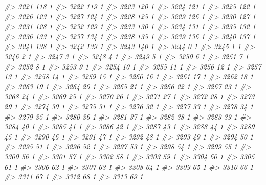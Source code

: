 \documentclass[]{article}
\newenvironment{Shaded}{\begin{snugshade}}{\end{snugshade}}
\newcommand{\CommentTok}[1]{\textcolor[rgb]{0.56,0.35,0.01}{\textit{#1}}}
\begin{document}
\begin{Shaded}
\begin{Highlighting}[]
\CommentTok{#> 3221 118  1}
\CommentTok{#> 3222 119  1}
\CommentTok{#> 3223 120  1}
\CommentTok{#> 3224 121  1}
\CommentTok{#> 3225 122  1}
\CommentTok{#> 3226 123  1}
\CommentTok{#> 3227 124  1}
\CommentTok{#> 3228 125  1}
\CommentTok{#> 3229 126  1}
\CommentTok{#> 3230 127  1}
\CommentTok{#> 3231 128  1}
\CommentTok{#> 3232 129  1}
\CommentTok{#> 3233 130  1}
\CommentTok{#> 3234 131  1}
\CommentTok{#> 3235 132  1}
\CommentTok{#> 3236 133  1}
\CommentTok{#> 3237 134  1}
\CommentTok{#> 3238 135  1}
\CommentTok{#> 3239 136  1}
\CommentTok{#> 3240 137  1}
\CommentTok{#> 3241 138  1}
\CommentTok{#> 3242 139  1}
\CommentTok{#> 3243 140  1}
\CommentTok{#> 3244   0  1}
\CommentTok{#> 3245   1  1}
\CommentTok{#> 3246   2  1}
\CommentTok{#> 3247   3  1}
\CommentTok{#> 3248   4  1}
\CommentTok{#> 3249   5  1}
\CommentTok{#> 3250   6  1}
\CommentTok{#> 3251   7  1}
\CommentTok{#> 3252   8  1}
\CommentTok{#> 3253   9  1}
\CommentTok{#> 3254  10  1}
\CommentTok{#> 3255  11  1}
\CommentTok{#> 3256  12  1}
\CommentTok{#> 3257  13  1}
\CommentTok{#> 3258  14  1}
\CommentTok{#> 3259  15  1}
\CommentTok{#> 3260  16  1}
\CommentTok{#> 3261  17  1}
\CommentTok{#> 3262  18  1}
\CommentTok{#> 3263  19  1}
\CommentTok{#> 3264  20  1}
\CommentTok{#> 3265  21  1}
\CommentTok{#> 3266  22  1}
\CommentTok{#> 3267  23  1}
\CommentTok{#> 3268  24  1}
\CommentTok{#> 3269  25  1}
\CommentTok{#> 3270  26  1}
\CommentTok{#> 3271  27  1}
\CommentTok{#> 3272  28  1}
\CommentTok{#> 3273  29  1}
\CommentTok{#> 3274  30  1}
\CommentTok{#> 3275  31  1}
\CommentTok{#> 3276  32  1}
\CommentTok{#> 3277  33  1}
\CommentTok{#> 3278  34  1}
\CommentTok{#> 3279  35  1}
\CommentTok{#> 3280  36  1}
\CommentTok{#> 3281  37  1}
\CommentTok{#> 3282  38  1}
\CommentTok{#> 3283  39  1}
\CommentTok{#> 3284  40  1}
\CommentTok{#> 3285  41  1}
\CommentTok{#> 3286  42  1}
\CommentTok{#> 3287  43  1}
\CommentTok{#> 3288  44  1}
\CommentTok{#> 3289  45  1}
\CommentTok{#> 3290  46  1}
\CommentTok{#> 3291  47  1}
\CommentTok{#> 3292  48  1}
\CommentTok{#> 3293  49  1}
\CommentTok{#> 3294  50  1}
\CommentTok{#> 3295  51  1}
\CommentTok{#> 3296  52  1}
\CommentTok{#> 3297  53  1}
\CommentTok{#> 3298  54  1}
\CommentTok{#> 3299  55  1}
\CommentTok{#> 3300  56  1}
\CommentTok{#> 3301  57  1}
\CommentTok{#> 3302  58  1}
\CommentTok{#> 3303  59  1}
\CommentTok{#> 3304  60  1}
\CommentTok{#> 3305  61  1}
\CommentTok{#> 3306  62  1}
\CommentTok{#> 3307  63  1}
\CommentTok{#> 3308  64  1}
\CommentTok{#> 3309  65  1}
\CommentTok{#> 3310  66  1}
\CommentTok{#> 3311  67  1}
\CommentTok{#> 3312  68  1}
\CommentTok{#> 3313  69  1}

\end{Highlighting}
\end{Shaded}
\end{document}
